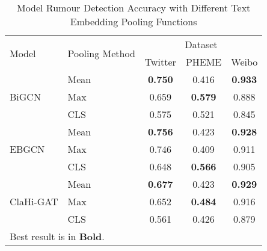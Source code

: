 \begin{table}[h!]
\caption{Model Rumour Detection Accuracy with Different Text Embedding Pooling Functions}
\centering
\label{tab:prediction}
\begin{tabular}{|l|l|c|c|c|}
\hline
\multirow{2}{*}{Model}     & \multirow{2}{*}{Pooling Method} & \multicolumn{3}{c|}{Dataset}                      \\
\cline{3-5}
                           &                                 & Twitter        & PHEME          & Weibo          \\
\hline
\multirow{3}{*}{BiGCN}     & Mean                            & \textbf{0.750} & 0.416          & \textbf{0.933} \\
                           & Max                             & 0.659          & \textbf{0.579} & 0.888          \\
                           & CLS                             & 0.575          & 0.521          & 0.845          \\
\hline
\multirow{3}{*}{EBGCN}     & Mean                            & \textbf{0.756} & 0.423          & \textbf{0.928} \\
                           & Max                             & 0.746          & 0.409          & 0.911          \\
                           & CLS                             & 0.648          & \textbf{0.566} & 0.905          \\
\hline
\multirow{3}{*}{ClaHi-GAT} & Mean                            & \textbf{0.677} & 0.423          & \textbf{0.929} \\
                           & Max                             & 0.652          & \textbf{0.484} & 0.916          \\
                           & CLS                             & 0.561          & 0.426          & 0.879         \\
\hline
\multicolumn{5}{l}{\footnotesize{Best result is in \textbf{Bold}.}} \\
\end{tabular}
\end{table}